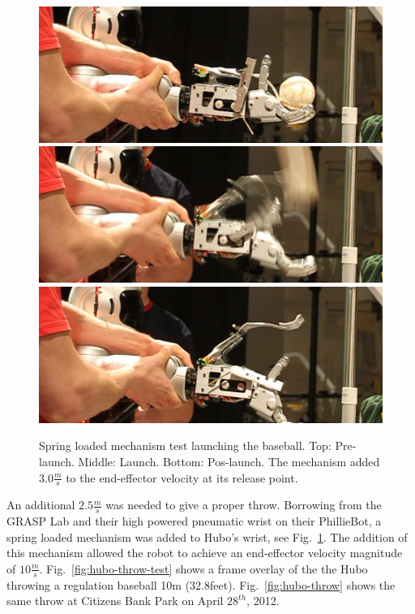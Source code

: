 \begin{figure}[t]
  \centering
\includegraphics[width=1.0\columnwidth]{./pix/finalSpring1.png}
\includegraphics[width=1.0\columnwidth]{./pix/finalSpring2.png}
\includegraphics[width=1.0\columnwidth]{./pix/finalSpring3.png}
  \caption{Spring loaded mechanism test launching the baseball.  Top: Pre-launch.  Middle: Launch.  Bottom: Pos-launch.  The mechanism added $3.0\frac{m}{s}$ to the end-effector velocity at its release point.}
  \label{fig:hubo-spring}
\end{figure}

An additional $2.5\frac{m}{s}$ was needed to give a proper throw.  
Borrowing from the GRASP Lab and their high powered pneumatic wrist on their PhillieBot, a spring loaded mechanism was added to Hubo's wrist, see Fig.~\ref{fig:hubo-spring}.
The addition of this mechanism allowed the robot to achieve an end-effector velocity magnitude of $10\frac{m}{s}$.
Fig.~\ref{fig:hubo-throw-test} shows a frame overlay of the the Hubo throwing a regulation baseball 10m (32.8feet).
Fig.~\ref{fig:hubo-throw} shows the same throw at Citizens Bank Park on April $28^{th}$, 2012.


